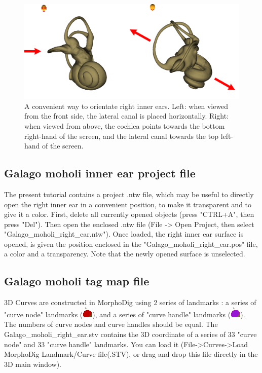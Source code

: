\documentclass[12pt, a4paper]{book}
\begin{document}
\begin{figure}
  \centering
  \includegraphics[scale=0.3]{pos.png} 
	\caption{A convenient way to orientate right inner ears.  Left: when viewed from the front side, the lateral canal is placed horizontally. Right: when viewed from above, the cochlea points towards the bottom right-hand of the screen, and the lateral canal towards the top left-hand of the screen.}
\label{orientation}
 
\end{figure}


\subsection{Galago moholi inner ear project file}
The present tutorial contains a project .ntw file, which may be useful to directly open the right inner ear
 in a convenient position, to make it transparent and to give it a color. First, delete all currently opened objects
(press "CTRL+A", then press "Del"). Then open the enclosed .ntw file (File -> Open Project, then select
"Galago\_moholi\_right\_ear.ntw"). Once loaded, the right inner ear surface is opened, is given the position
enclosed in the "Galago\_moholi\_right\_ear.pos" file, a color and a transparency. Note that the newly opened
surface is unselected.\\

\subsection{Galago moholi tag map file}
3D Curves are constructed in MorphoDig using 2 series of landmarks : a series of "curve node" landmarks (\includegraphics[scale=0.7]{../images/04/curve_nodes.png}),
and a series of "curve handle" landmarks (\includegraphics[scale=0.7]{../images/04/curve_handles.png}). The numbers of curve nodes and curve handles should be equal. The Galago\_moholi\_right\_ear.stv contains the 3D coordinate of a series of  33 "curve node" and 33 "curve handle" landmarks. You can load it (File->Curves->Load MorphoDig Landmark/Curve file(.STV), or drag and drop this file directly in the 3D main window).\\
\end{document}
